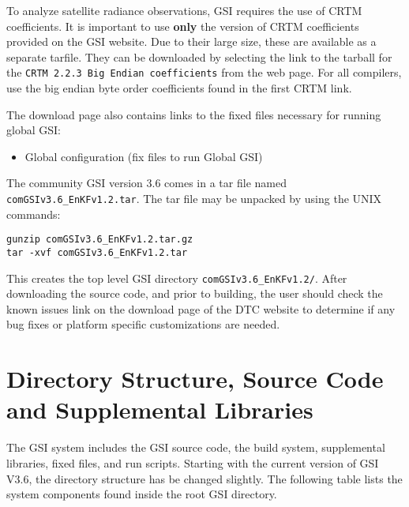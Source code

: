 To analyze satellite radiance observations, GSI requires the use of CRTM coefficients. It is important to
use \textbf{only} the version of CRTM coefficients provided on the GSI website. Due to their large size, 
these are available as a separate tarfile. They can be downloaded by selecting the link to the 
tarball for the \verb|CRTM 2.2.3 Big Endian coefficients| from the web page. For all compilers, 
use the big endian byte order coefficients found in the first CRTM link.

The download page also contains links to the fixed files necessary for 
running global GSI:

\begin{itemize}
\item Global configuration (fix files to run Global GSI)
\end{itemize}

The community GSI version 3.6 comes in a tar file named \verb|comGSIv3.6_EnKFv1.2.tar|. The tar 
file may be unpacked by using the UNIX commands:

\begin{small}
\begin{verbatim}
gunzip comGSIv3.6_EnKFv1.2.tar.gz
tar -xvf comGSIv3.6_EnKFv1.2.tar
\end{verbatim}
\end{small}

This creates the top level GSI directory \verb|comGSIv3.6_EnKFv1.2/|.
After downloading the source code, and prior to building, the user should check the known issues 
link on the download page of the DTC website to determine if any bug fixes or platform specific customizations are needed.

\section{Directory Structure, Source Code and Supplemental Libraries}  \label{ch2_directorystructure}

The GSI system includes the GSI source code, the build system, supplemental libraries, fixed files, and run scripts. Starting with the current version of GSI V3.6, the directory structure has be changed slightly. 
The following table lists the system components found inside the root GSI directory.


